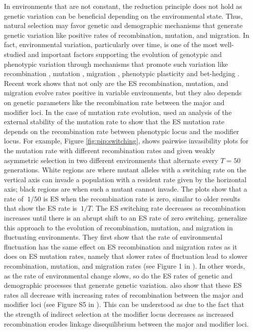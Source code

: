 \documentclass[11pt]{article}
\begin{document}
In environments that are not constant, the reduction principle does not hold as genetic variation can be beneficial depending on the environmental state. Thus, natural selection may favor genetic and demographic mechanisms that generate genetic variation like positive rates of recombination, mutation, and migration. In fact, environmental variation, particularly over time, is one of the most well-studied and important factors supporting the evolution of genotypic and phenotypic variation through mechanisms that promote such variation like recombination \cite{Charlesworth:1976,Sasaki:Iwasa:1987,Otto:Michalakis:1998}, mutation \cite{Leigh:1970,Ishii:Matsuda:1989,Lachmann:Jablonka:1996}, migration \cite{Gillespie:1981,McPeek:Holt:1992,Blanquart:Gandon:2011}, phenotypic plasticity \cite{Caswell:1983,Via:Lande:1985,Gavrilets:Scheiner:1993,Jong:1995} and bet-hedging \cite{Slatkin:1974,Seger:Brockmann:1987,Kussell:Leibler:2005,Salathe:VanCleve:2009}. Recent work shows that not only are the ES recombination, mutation, and migration evolve rates positive in variable environments, but they also depends on genetic parameters like the recombination rate between the major and modifier loci. In the case of mutation rate evolution, \citeauthor{Liberman:VanCleve:2011} \cite{Liberman:VanCleve:2011} used an analysis of the external stability of the mutation rate to show that the ES mutation rate depends on the recombination rate between phenotypic locus and the modifier locus. For example, Figure \ref{fig:pip:switching}, shows pairwise invasibility plots for the mutation rate with different recombination rates and given weakly asymmetric selection in two different environments that alternate every $T=50$ generations. White regions are where mutant alleles with a switching rate on the vertical axis can invade a population with a resident rate given by the horizontal axis; black regions are when such a mutant cannot invade. The plots show that a rate of $~1/50$ is ES when the recombination rate is zero, similar to older results \cite{Leigh:1970,Lachmann:Jablonka:1996} that show the ES rate is $~1/T$. The ES switching rate decreases as recombination increases until there is an abrupt shift to an ES rate of zero switching. \citeauthor{Carja:Liberman:2014} \cite{Carja:Liberman:2014} generalize this approach to the evolution of recombination, mutation, and migration in fluctuating environments. They first show that the rate of environmental fluctuation has the same effect on ES recombination and migration rates as it does on ES mutation rates, namely that slower rates of fluctuation lead to slower recombination, mutation, and migration rates (see Figure 1 in \cite{Carja:Liberman:2014}). In other words, as the rate of environmental change slows, so do the ES rates of genetic and demographic processes that generate genetic variation. \citeauthor{Carja:Liberman:2014} also show that these ES rates all decrease with increasing rates of recombination between the major and modifier loci (see Figure S5 in \cite{Carja:Liberman:2014}). This can be understood as due to the fact that the strength of indirect selection at the modifier locus decreases as increased recombination erodes linkage disequilibrium between the major and modifier loci.
\end{document}
